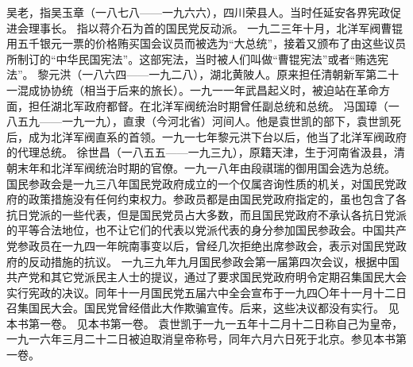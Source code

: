 \begin{maonote}
吴老，指吴玉章（一八七八——一九六六），四川荣县人。当时任延安各界宪政促进会理事长。
指以蒋介石为首的国民党反动派。
一九二三年十月，北洋军阀曹锟用五千银元一票的价格贿买国会议员而被选为“大总统”，接着又颁布了由这些议员所制订的“中华民国宪法”。这部宪法，当时被人们叫做“曹锟宪法”或者“贿选宪法”。
黎元洪（一八六四——一九二八），湖北黄陂人。原来担任清朝新军第二十一混成协协统（相当于后来的旅长）。一九一一年武昌起义时，被迫站在革命方面，担任湖北军政府都督。在北洋军阀统治时期曾任副总统和总统。
冯国璋（一八五九——一九一九），直隶（今河北省）河间人。他是袁世凯的部下，袁世凯死后，成为北洋军阀直系的首领。一九一七年黎元洪下台以后，他当了北洋军阀政府的代理总统。
徐世昌（一八五五——一九三九），原籍天津，生于河南省汲县，清朝末年和北洋军阀统治时期的官僚。一九一八年由段祺瑞的御用国会选为总统。
国民参政会是一九三八年国民党政府成立的一个仅属咨询性质的机关，对国民党政府的政策措施没有任何约束权力。参政员都是由国民党政府指定的，虽也包含了各抗日党派的一些代表，但是国民党员占大多数，而且国民党政府不承认各抗日党派的平等合法地位，也不让它们的代表以党派代表的身分参加国民参政会。中国共产党参政员在一九四一年皖南事变以后，曾经几次拒绝出席参政会，表示对国民党政府的反动措施的抗议。
一九三九年九月国民参政会第一届第四次会议，根据中国共产党和其它党派民主人士的提议，通过了要求国民党政府明令定期召集国民大会实行宪政的决议。同年十一月国民党五届六中全会宣布于一九四〇年十一月十二日召集国民大会。国民党曾经借此大作欺骗宣传。后来，这些决议都没有实行。
见本书第一卷。
见本书第一卷。
袁世凯于一九一五年十二月十二日称自己为皇帝，一九一六年三月二十二日被迫取消皇帝称号，同年六月六日死于北京。参见本书第一卷。
\end{maonote}
